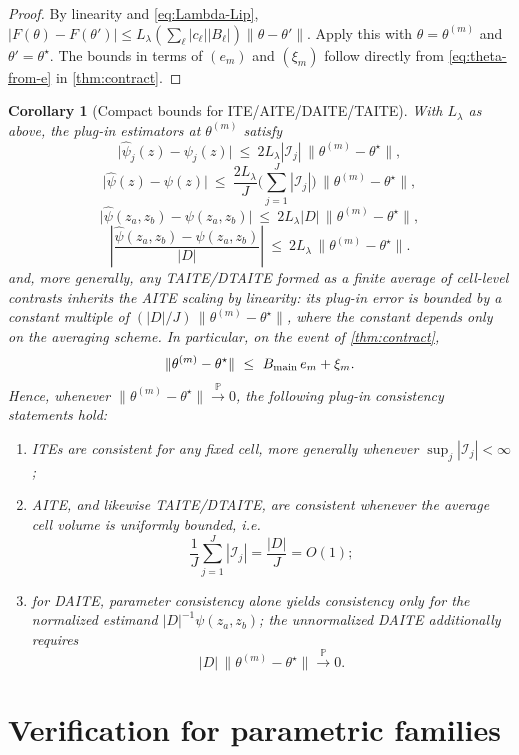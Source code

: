 \documentclass{statsoc}
\newtheorem{corollary}[corollary]{Corollary}
\newcommand{\1}{\mathbbm{1}}
\begin{document}
\begin{proof}
By linearity and \eqref{eq:Lambda-Lip},
$|F(\theta)-F(\theta')|\le L_\lambda(\sum_\ell |c_\ell||B_\ell|)\|\theta-\theta'\|$.
Apply this with $\theta=\theta^{(m)}$ and $\theta'=\theta^\star$.
The bounds in terms of $(e_m)$ and $(\xi_m)$ follow directly from \eqref{eq:theta-from-e} in \cref{thm:contract}.
\end{proof}

\begin{corollary}[Compact bounds for ITE/AITE/DAITE/TAITE]\label{cor:compact-estimands}
With $L_\lambda$ as above, the plug-in estimators at $\theta^{(m)}$ satisfy
\[
\big|\widehat\psi_j(z)-\psi_j(z)\big|\ \le\ 2L_\lambda |\mathcal I_j|\,\|\theta^{(m)}-\theta^\star\|,
\]
\[
\big|\widehat\psi(z)-\psi(z)\big|\ \le\ \frac{2L_\lambda}{J}\Big(\sum_{j=1}^J |\mathcal I_j|\Big)\,\|\theta^{(m)}-\theta^\star\|,
\]
\[
\big|\widehat\psi(z_a,z_b)-\psi(z_a,z_b)\big|\ \le\ 2L_\lambda |D|\,\|\theta^{(m)}-\theta^\star\|,
\]
\[
\left|\frac{\widehat\psi(z_a,z_b)-\psi(z_a,z_b)}{|D|}\right|
\ \le\ 2L_\lambda\,\|\theta^{(m)}-\theta^\star\|.
\]
and, more generally, any TAITE/DTAITE formed as a finite average of cell-level contrasts inherits the AITE scaling by linearity: its plug-in error is bounded by a constant multiple of \((|D|/J)\,\|\theta^{(m)}-\theta^\star\|\), where the constant depends only on the averaging scheme. In particular, on the event of \cref{thm:contract},
\[
\|\theta^{(m)}-\theta^\star\|\ \le\ B_{\rm main}\,e_m+\xi_m.
\]
Hence, whenever \(\|\theta^{(m)}-\theta^\star\|\xrightarrow{\mathbb P}0\), the following plug-in consistency statements hold:
\begin{enumerate}[nosep,label=(\alph*)]
\item ITEs are consistent for any fixed cell, more generally whenever \(\sup_j |\mathcal I_j|<\infty\);
\item AITE, and likewise TAITE/DTAITE, are consistent whenever the average cell volume is uniformly bounded, i.e.
\[
\frac{1}{J}\sum_{j=1}^J |\mathcal I_j|=\frac{|D|}{J}=O(1);
\]
\item for DAITE, parameter consistency alone yields consistency only for the normalized estimand \(|D|^{-1}\psi(z_a,z_b)\); the unnormalized DAITE additionally requires
\[
|D|\,\|\theta^{(m)}-\theta^\star\|\xrightarrow{\mathbb P}0.
\]
\end{enumerate}
\end{corollary}

\section{Verification for parametric families}
\end{document}
